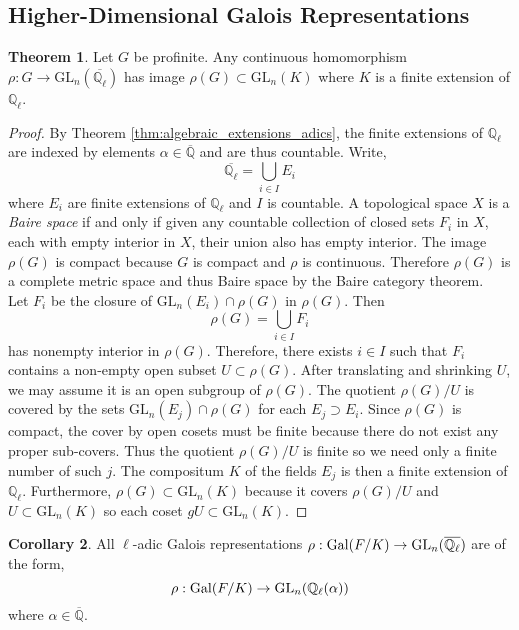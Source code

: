 \documentclass[12pt]{article}
\newcommand{\Q}{\mathbb{Q}}
\newcommand{\Gal}[1]{\mathrm{Gal} \small(#1 \small)}
\newcommand{\GL}[2]{\mathrm{GL}_{#1}(#2)}
\theoremstyle{remark}
\theoremstyle{definition}
\newtheorem{theorem}{Theorem}[section]
\newtheorem{corollary}[theorem]{Corollary}
\begin{document}
\subsection{Higher-Dimensional Galois Representations}

\begin{theorem}
Let $G$ be profinite. Any continuous homomorphism $\rho : G \to \GL{n}{\overline{\Q_{\ell}}}$ has image $\rho(G) \subset \GL{n}{K}$ where $K$ is a finite extension of $\Q_{\ell}$.  
\end{theorem}

\begin{proof}
By Theorem \ref{thm:algebraic_extensions_adics}, the finite extensions of $\Q_{\ell}$ are indexed by elements $\alpha \in \overline{\Q}$ and are thus countable. Write,
\[ \overline{\Q_{\ell}} = \bigcup_{i \in I} E_i \]
where $E_i$ are finite extensions of $\Q_{\ell}$ and $I$ is countable. A topological space $X$ is a \textit{Baire space} if and only if
given any countable collection of closed sets $F_i$ in $X$, each with empty interior in $X$, their union also has empty interior. The image $\rho(G)$ is compact because $G$ is compact and $\rho$ is continuous. Therefore $\rho(G)$ is a complete metric space and thus Baire space by the Baire category theorem. 
\bigskip\\
Let $F_i$ be the closure of $\GL{n}{E_i} \cap \rho(G)$ in $\rho(G)$. Then
\[ \rho(G) = \bigcup_{i \in I} F_i \]
has nonempty interior in $\rho(G)$. Therefore, there exists $i \in I$ such that $F_i$ contains a non-empty open subset $U \subset \rho(G)$. After translating and shrinking $U$, we may assume it is an open subgroup of $\rho(G)$. The
quotient $\rho(G) / U$ is covered by the sets $\GL{n}{E_j} \cap \rho(G)$ for each $E_j \supset E_i$. Since $\rho(G)$ is compact, the cover by open cosets must be finite because there do not exist any proper sub-covers. Thus the quotient $\rho(G) / U$ is finite so we need only a finite number of such $j$. The compositum $K$ of the fields $E_j$ is then a finite extension of $\Q_{\ell}$. Furthermore, $\rho(G) \subset \GL{n}{K}$ because it covers $\rho(G) / U$ and $U \subset \GL{n}{K}$ so each coset $g U \subset \GL{n}{K}$.
\end{proof}

\begin{corollary}
All $\ell$-adic Galois representations $\rho : \Gal{F / K} \to \GL{n}{\overline{\Q_{\ell}}}$ are of the form,
\[ \rho : \Gal{F / K} \to \GL{n}{\Q_{\ell}(\alpha)} \]
where $\alpha \in \overline{\Q}$.  
\end{corollary}
\end{document}
